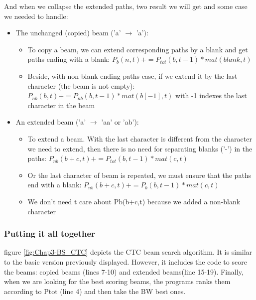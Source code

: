 And when we collapse the extended paths, two result we will get and some case we needed to handle:
\begin{itemize}
	\item The unchanged (copied) beam ('a' $ \rightarrow $ 'a'):
	      \begin{itemize}
		      \item To copy a beam, we can extend corresponding paths by a blank and get
		            paths ending with a blank: $ P_b (n, t) += P_{tot}(b, t-1)*mat(blank, t) $
		      \item Beside, with non-blank ending paths case, if we extend it by the last
		            character (the beam is not empty): $ P_{nb}(b,t) += P_{nb}(b,t-1)*mat(b[-1],t) $
		            with -1 indexes the last character in the beam
	      \end{itemize}
	\item An extended beam ('a' $\rightarrow$ 'aa' or 'ab'):
	      \begin{itemize}
		      \item To extend a beam. With the last character is different from the character we need
		            to extend, then there is no need for separating blanks ('-') in the paths:
		            $ P_{nb}(b+c,t) += P_{tot}(b,t-1)*mat(c,t) $
		      \item Or the last character of beam is repeated, we must ensure that the paths
		            end with a blank: $ P_{nb}(b+c,t) += P_b(b,t-1)*mat(c,t) $
		      \item We don't need t care about Pb(b+c,t) because we added a non-blank character
	      \end{itemize}
\end{itemize}

\subsubsection{Putting it all together}
figure \ref{fig:Chap3-BS_CTC} depicts the CTC beam search algorithm. It is similar to the basic version
previously displayed. However, it includes the code to score the beams: copied beams
(lines 7-10) and extended beams(line 15-19). Finally, when we are looking for the best scoring
beams, the programs ranks them according to Ptot (line 4) and then take the BW best ones.

